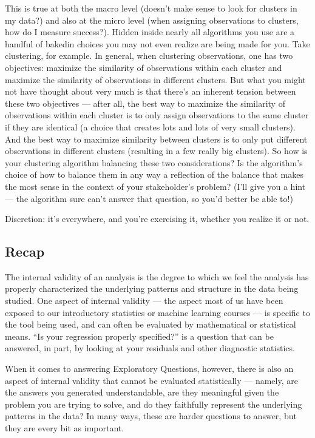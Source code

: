 \documentclass[letterpaper,10pt,english]{jupyterBook}
\begin{document}
\sphinxAtStartPar
This is true at both the macro level (doesn’t make sense to look for clusters in my data?) and also at the micro level (when assigning observations to clusters, how do I measure success?). Hidden inside nearly all algorithms you use are a handful of baked\sphinxhyphen{}in choices you may not even realize are being made for you. Take clustering, for example. In general, when clustering observations, one has two objectives: maximize the similarity of observations within each cluster and maximize the similarity of observations in different clusters. But what you might not have thought about very much is that there’s an inherent tension between these two objectives — after all, the best way to maximize the similarity of observations within each cluster is to only assign observations to the same cluster if they are identical (a choice that creates lots and lots of very small clusters). And the best way to maximize similarity between clusters is to only put  different observations in different clusters (resulting in a few really big clusters). So how is your clustering algorithm balancing these two considerations? Is the algorithm’s choice of how to balance them in any way a reflection of the balance that makes the most sense in the context of your stakeholder’s problem? (I’ll give you a hint — the algorithm sure can’t answer that question, so you’d better be able to!)

\sphinxAtStartPar
Discretion: it’s everywhere, and you’re exercising it, whether you realize it or not.


\subsection{Recap}
\label{\detokenize{30_questions/19_exploratory_internal_meaningful:recap}}
\sphinxAtStartPar
The internal validity of an analysis is the degree to which we feel the analysis has properly characterized the underlying patterns and structure in the data being studied. One aspect of internal validity — the aspect most of us have been exposed to our introductory statistics or machine learning courses — is specific to the tool being used, and can often be evaluated by mathematical or statistical means. “Is your regression properly specified?” is a question that can be answered, in part, by looking at your residuals and other diagnostic statistics.

\sphinxAtStartPar
When it comes to answering Exploratory Questions, however, there is also an aspect of internal validity that cannot be evaluated statistically — namely, are the answers you generated understandable, are they meaningful given the problem you are trying to solve, and do they faithfully represent the underlying patterns in the data? In many ways, these are harder questions to answer, but they are every bit as important.
\end{document}
